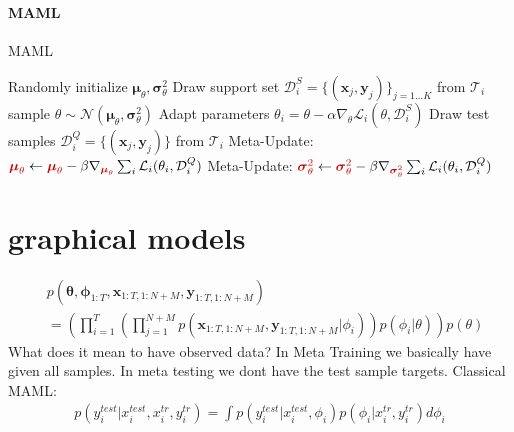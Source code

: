 \documentclass{article}
\begin{document}
	\section{}
	\paragraph{MAML}
	\begin{algorithm}
		\caption{MAML}
		\begin{algorithmic}  
			\STATE Randomly initialize \textcolor{bostonuniversityred}{ $\boldsymbol{\mu}_{\theta}, \boldsymbol{\sigma}^2_{\theta}$}
			\STATE Draw support set $\mathcal{D}_i^{S} = \{ (\boldsymbol{x}_j, \boldsymbol{y}_j)\}_{j=1...K}$ from $\mathcal{T}_i$
			\STATE \textcolor{bostonuniversityred}{ sample $\theta \sim \mathcal{N}(\boldsymbol{\mu}_{\theta}, \boldsymbol{\sigma}^2_{\theta})$}
			\STATE Adapt parameters $\theta_i = \theta - \alpha \nabla_{\theta} \mathcal{L}_i(\theta, \mathcal{D}_i^{S}) $
			\STATE Draw test samples  $\mathcal{D}_i^{Q} = \{(\boldsymbol{x}_j, \boldsymbol{y}_j)\}$ from $\mathcal{T}_i$
			\ENDFOR
			\STATE Meta-Update: $\textcolor{bostonuniversityred}{\boldsymbol{\mu}_\theta} \leftarrow \textcolor{bostonuniversityred}{\boldsymbol{\mu}_\theta} - \beta \nabla_{\textcolor{bostonuniversityred}{\boldsymbol{\mu}_\theta}} \sum_{i} \mathcal{L}_i(\theta_i, \mathcal{D}_{i}^{Q})$
			\STATE Meta-Update: $\textcolor{bostonuniversityred}{\boldsymbol{\sigma}^2_\theta} \leftarrow \textcolor{bostonuniversityred}{\boldsymbol{\sigma}^2_\theta} - \beta \nabla_{\textcolor{bostonuniversityred}{\boldsymbol{\sigma}^2_\theta}} \sum_{i} \mathcal{L}_i(\theta_i, \mathcal{D}_{i}^{Q})$
			\ENDWHILE
		\end{algorithmic}
	\end{algorithm}
	\section{graphical models}
		\begin{align*}
			&p(\boldsymbol{\theta}, \boldsymbol{\phi}_{1:T}, \boldsymbol{x}_{1:T, 1:N+M}, \boldsymbol{y}_{1:T, 1:N+M}) \\
			&= \left( \prod_{i=1}^{T} \left( \prod_{j=1}^{N+M} p(\boldsymbol{x}_{1:T, 1:N+M}, \boldsymbol{y}_{1:T, 1:N+M} \vert \phi_i) \right) p(\phi_i \vert \theta) \right) p(\theta)
		\end{align*}
	What does it mean to have observed data? In Meta Training we basically have given all samples. In meta testing we dont have the test sample targets. Classical MAML:
	\begin{align*}
		p(y_i^{test} \vert x_i^{test}, x_i^{tr}, y_i^{tr}) = \int p(y_i^{test} \vert x_i^{test}, \phi_i) p(\phi_i \vert x_i^{tr}, y_i^{tr}) d \phi_i
	\end{align*}
\newpage
\end{document}
